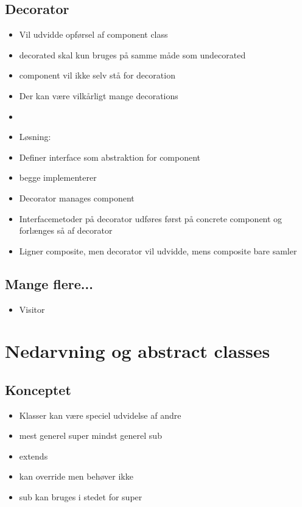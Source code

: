 \subsection{Decorator} %
\label{sub:decorator}
\begin{itemize}
    \item Vil udvidde opførsel af component class
    \item decorated skal kun bruges på samme måde som undecorated
    \item component vil ikke selv stå for decoration
    \item Der kan være vilkårligt mange decorations
    \item
    \item Løsning:
    \item Definer interface som abstraktion for component
    \item begge implementerer
    \item Decorator manages component
    \item Interfacemetoder på decorator udføres først på concrete component og forlænges så af decorator
    \item Ligner composite, men decorator vil udvidde, mens composite bare samler
\end{itemize}

\subsection{Mange flere...} %
\label{sub:mange_flere_}
\begin{itemize}
    \item Visitor
\end{itemize}
\newpage
\section{Nedarvning og abstract classes} %
\label{sec:nedarvning_og_abstract_classes}
\subsection{Konceptet} %
\label{sub:konceptet}
\begin{itemize}
    \item Klasser kan være speciel udvidelse af andre
    \item mest generel super mindst generel sub
    \item extends
    \item kan override men behøver ikke
    \item sub kan bruges i stedet for super
\end{itemize}
